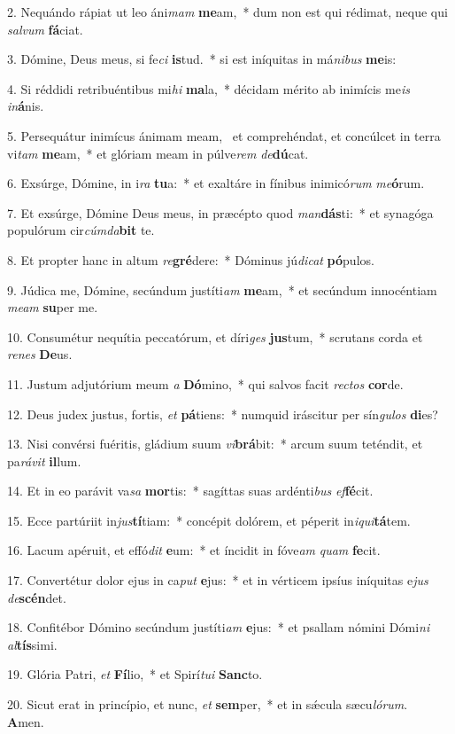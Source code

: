 2. Nequándo rápiat ut leo áni\textit{mam} \textbf{me}am,~*  dum non est qui rédimat, neque qui \textit{sal}\textit{vum} \textbf{fá}ciat.\

3. Dómine, Deus meus, si fe\textit{ci} \textbf{is}tud.~*  si est iníquitas in má\textit{ni}\textit{bus} \textbf{me}is:\

4. Si réddidi retribuéntibus mi\textit{hi} \textbf{ma}la,~*  décidam mérito ab inimícis me\textit{is} \textit{in}\textbf{á}nis.\

5. Persequátur inimícus ánimam meam, \dag\  et comprehéndat, et concúlcet in terra vi\textit{tam} \textbf{me}am,~*  et glóriam meam in púlve\textit{rem} \textit{de}\textbf{dú}cat.\

6. Exsúrge, Dómine, in i\textit{ra} \textbf{tu}a:~*  et exaltáre in fínibus inimicó\textit{rum} \textit{me}\textbf{ó}rum.\

7. Et exsúrge, Dómine Deus meus, in præcépto quod \textit{man}\textbf{dás}ti:~*  et synagóga populórum cir\textit{cúm}\textit{da}\textbf{bit} te.\

8. Et propter hanc in altum \textit{re}\textbf{gré}dere:~*  Dóminus jú\textit{di}\textit{cat} \textbf{pó}pulos.\

9. Júdica me, Dómine, secúndum justíti\textit{am} \textbf{me}am,~*  et secúndum innocéntiam \textit{me}\textit{am} \textbf{su}per me.\

10. Consumétur nequítia peccatórum, et díri\textit{ges} \textbf{jus}tum,~*  scrutans corda et \textit{re}\textit{nes} \textbf{De}us.\

11. Justum adjutórium meum \textit{a} \textbf{Dó}mino,~*  qui salvos facit \textit{rec}\textit{tos} \textbf{cor}de.\

12. Deus judex justus, fortis, \textit{et} \textbf{pá}tiens:~*  numquid iráscitur per sín\textit{gu}\textit{los} \textbf{di}es?\

13. Nisi convérsi fuéritis, gládium suum \textit{vi}\textbf{brá}bit:~*  arcum suum teténdit, et pa\textit{rá}\textit{vit} \textbf{il}lum.\

14. Et in eo parávit va\textit{sa} \textbf{mor}tis:~*  sagíttas suas ardénti\textit{bus} \textit{ef}\textbf{fé}cit.\

15. Ecce partúriit in\textit{jus}\textbf{tí}tiam:~*  concépit dolórem, et péperit in\textit{i}\textit{qui}\textbf{tá}tem.\

16. Lacum apéruit, et effó\textit{dit} \textbf{e}um:~*  et íncidit in fóve\textit{am} \textit{quam} \textbf{fe}cit.\

17. Convertétur dolor ejus in ca\textit{put} \textbf{e}jus:~*  et in vérticem ipsíus iníquitas e\textit{jus} \textit{de}\textbf{scén}det.\

18. Confitébor Dómino secúndum justíti\textit{am} \textbf{e}jus:~*  et psallam nómini Dómi\textit{ni} \textit{al}\textbf{tís}simi.\

19. Glória Patri, \textit{et} \textbf{Fí}lio,~*  et Spirí\textit{tu}\textit{i} \textbf{Sanc}to.\

20. Sicut erat in princípio, et nunc, \textit{et} \textbf{sem}per,~*  et in sǽcula sæcu\textit{ló}\textit{rum}. \textbf{A}men.\

